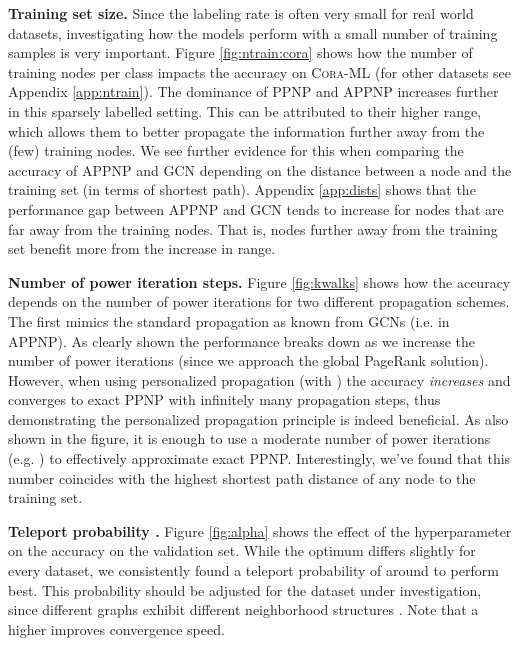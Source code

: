 \documentclass{article} \usepackage{iclr2019_conference,times}
\begin{document}
\textbf{Training set size.} Since the labeling rate is often very small for real world datasets, investigating how the models perform with a small number of training samples is very important. Figure \ref{fig:ntrain:cora} shows how the number of training nodes per class  impacts the accuracy on \textsc{Cora-ML} (for other datasets see Appendix \ref{app:ntrain}). The dominance of PPNP and APPNP increases further in this sparsely labelled setting. This can be attributed to their higher range, which allows them to better propagate the information further away from the (few) training nodes.
We see further evidence for this when comparing the accuracy of APPNP and GCN depending on the distance between a node and the training set (in terms of shortest path). Appendix \ref{app:dists} shows that the performance gap between APPNP and GCN tends to increase for nodes that are far away from the training nodes. That is, nodes further away from the training set benefit more from the increase in range.


\textbf{Number of power iteration steps.} 
Figure \ref{fig:kwalks} shows how the accuracy depends on the number of power iterations for two different propagation schemes. The first mimics the standard propagation as known from GCNs (i.e.  in APPNP). As clearly shown the performance breaks down as we increase the number of power iterations  (since we approach the global PageRank solution). However, when using personalized propagation (with ) the accuracy \textit{increases} and converges to exact PPNP with infinitely many propagation steps, thus demonstrating the personalized propagation principle is indeed beneficial. As also shown in the figure, it is enough to use a moderate number of power iterations (e.g. ) to effectively approximate exact PPNP. Interestingly, we've found that this number coincides with the highest shortest path distance of any node to the training set.

\textbf{Teleport probability .} Figure \ref{fig:alpha} shows the effect of the hyperparameter  on the accuracy on the validation set. While the optimum differs slightly for every dataset, we consistently found a teleport probability of around  to perform best. This probability should be adjusted for the dataset under investigation, since different graphs exhibit different neighborhood structures \citep{grover_node2vec:_2016,abu-el-haija_watch_2018}. Note that a higher  improves convergence speed.
\end{document}
